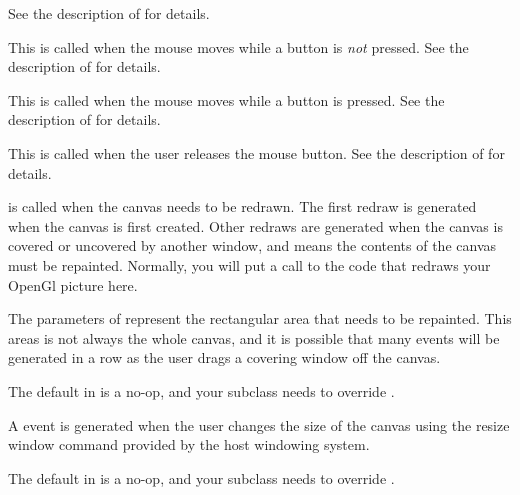 See the description of  for details.


This is called when the mouse moves while a button is \emph{not}
pressed.
See the description of  for details.


This is called when the mouse moves while a button is pressed.
See the description of  for details.


This is called when the user releases the mouse button.
See the description of  for details.


 is called when the canvas needs to be redrawn.
The first redraw is generated when the canvas is first created.
Other redraws are generated when the canvas is covered or uncovered
by another window, and means the contents of the canvas must
be repainted. Normally, you will put a call to the code that
redraws your OpenGl picture here.

The parameters of  represent the rectangular area
that needs to be repainted. This areas is not always the whole
canvas, and it is possible that many  events will
be generated in a row as the user drags a covering window off
the canvas.

The default  in  is a
no-op, and your subclass needs to override .


A  event is generated when the user changes the
size of the canvas using the resize window command provided
by the host windowing system.

The default  in  is a
no-op, and your subclass needs to override .


